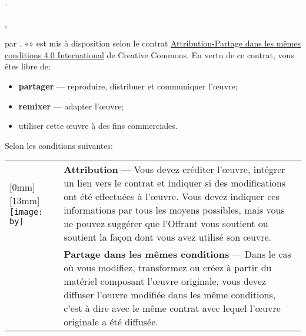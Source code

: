 
\begingroup
\calccentering{\unitlength}
\begin{adjustwidth*}{\unitlength}{-\unitlength}
  \setlength{\parindent}{0pt}
  \setlength{\parskip}{\baselineskip}
  \small

  \raisebox{-2.5mm}{%
    \texttt{[image: by-sa]}} %
  {\theauthor}, {\year}

  {\textcopyright} {\year} par {\theauthor}. «\thetitle»
  est mis à disposition selon le contrat
  \href{http://creativecommons.org/licenses/by-sa/4.0/deed.fr}{%
    Attribution-Partage dans les mêmes conditions 4.0 International} de
  Creative Commons. En vertu de ce contrat, vous êtes libre de:
  \begin{itemize}
  \item \textbf{partager} --- reproduire, distribuer et communiquer
    l'œuvre;
  \item \textbf{remixer} --- adapter l'œuvre;
  \item utiliser cette œuvre à des fins commerciales.
  \end{itemize}
  Selon les conditions suivantes:

  \begin{tabularx}{\linewidth}{@{}lX@{}}
    \raisebox{-9mm}[0mm][13mm]{%
      \texttt{[image: by]}} &
    \textbf{Attribution} --- Vous devez créditer l'œuvre, intégrer
    un lien vers le contrat et indiquer si des modifications ont été
    effectuées à l'œuvre. Vous devez indiquer ces informations par
    tous les moyens possibles, mais vous ne pouvez suggérer que
    l'Offrant vous soutient ou soutient la façon dont vous avez utilisé
    son œuvre. \\
    \raisebox{-9mm}{\texttt{[image: sa]}}
    & \textbf{Partage dans les mêmes conditions} --- Dans le cas où vous
    modifiez, transformez ou créez à partir du matériel composant
    l'œuvre originale, vous devez diffuser l'œuvre modifiée dans
    les même conditions, c'est à dire avec le même contrat avec lequel
    l'œuvre originale a été diffusée.
  \end{tabularx}


\end{adjustwidth*}
